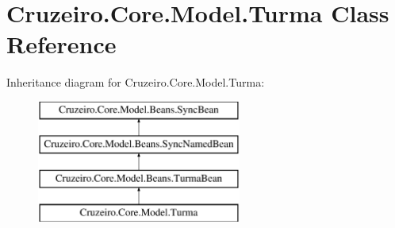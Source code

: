 \hypertarget{class_cruzeiro_1_1_core_1_1_model_1_1_turma}{}\section{Cruzeiro.\+Core.\+Model.\+Turma Class Reference}
\label{class_cruzeiro_1_1_core_1_1_model_1_1_turma}
Inheritance diagram for Cruzeiro.\+Core.\+Model.\+Turma\+:\begin{figure}[H]
\begin{center}
\leavevmode
\includegraphics[height=4.000000cm]{class_cruzeiro_1_1_core_1_1_model_1_1_turma}
\end{center}
\end{figure}
